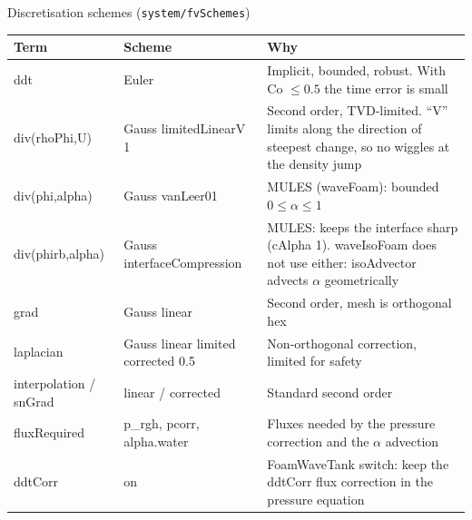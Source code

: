 \documentclass[aspectratio=169,10pt]{beamer}
\newcommand{\key}[1]{{\leavevmode\ttfamily\color{sea}#1}}
\begin{document}
\begin{frame}{Discretisation schemes (\texttt{system/fvSchemes})}
  \footnotesize
  \renewcommand{\arraystretch}{1.1}
  \begin{tabularx}{\linewidth}{@{}P{3.0cm}P{4.6cm}L@{}}
    \toprule
    Term & Scheme & Why \\
    \midrule
    \key{ddt} & \key{Euler} & Implicit, bounded, robust. With Co $\le 0.5$ the time error is small \\
    \key{div(rhoPhi,U)} & \key{Gauss limitedLinearV 1} & Second order, TVD-limited. ``V'' limits along the direction of steepest change, so no wiggles at the density jump \\
    \key{div(phi,alpha)} & \key{Gauss vanLeer01} & MULES (waveFoam): bounded $0\le\alpha\le1$ \\
    \key{div(phirb,alpha)} & \key{Gauss interfaceCompression} & MULES: keeps the interface sharp (\key{cAlpha 1}). waveIsoFoam does not use either: isoAdvector advects $\alpha$ geometrically \\
    \key{grad} & \key{Gauss linear} & Second order, mesh is orthogonal hex \\
    \key{laplacian} & \key{Gauss linear limited corrected 0.5} & Non-orthogonal correction, limited for safety \\
    \key{interpolation} / \key{snGrad} & \key{linear} / \key{corrected} & Standard second order \\
    \key{fluxRequired} & \key{p\_rgh}, \key{pcorr}, \key{alpha.water} & Fluxes needed by the pressure correction and the $\alpha$ advection \\
    \key{ddtCorr} & \key{on} & FoamWaveTank switch: keep the ddtCorr flux correction in the pressure equation \\
    \bottomrule
  \end{tabularx}
\end{frame}
\end{document}
